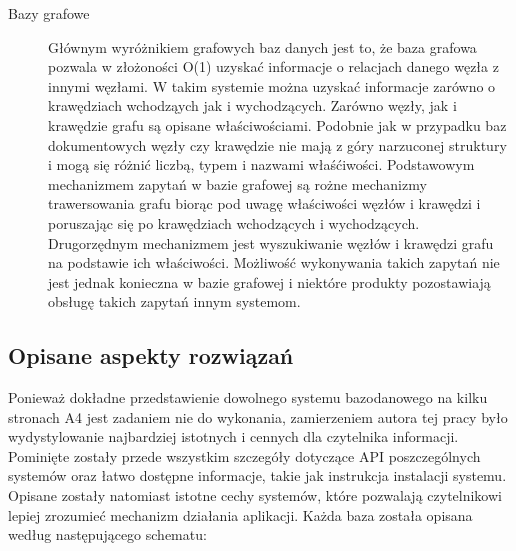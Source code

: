 \begin{description}
 \item[Bazy grafowe]
 Głównym wyróżnikiem grafowych baz danych jest to, że baza grafowa pozwala w złożoności O(1) uzyskać informacje o relacjach danego węzła z innymi węzłami.
 W takim systemie można uzyskać informacje zarówno o krawędziach wchodząych jak i wychodzących.
 Zarówno węzły, jak i krawędzie grafu są opisane właściwościami.
 Podobnie jak w przypadku baz dokumentowych węzły czy krawędzie nie mają z góry narzuconej struktury i mogą się różnić liczbą, typem i nazwami właśćiwości.
 Podstawowym mechanizmem zapytań w bazie grafowej są rożne mechanizmy trawersowania grafu biorąc pod uwagę właściwości węzłów i krawędzi i poruszając się po krawędziach wchodzących i wychodzących.
 Drugorzędnym mechanizmem jest wyszukiwanie węzłów i krawędzi grafu na podstawie ich właściwości.
 Możliwość wykonywania takich zapytań nie jest jednak konieczna w bazie grafowej i niektóre produkty pozostawiają obsługę takich zapytań innym systemom. 
\end{description}

\subsection*{Opisane aspekty rozwiązań}

Ponieważ dokładne przedstawienie dowolnego systemu bazodanowego na kilku stronach A4 jest zadaniem nie do wykonania, zamierzeniem autora tej pracy było wydystylowanie najbardziej istotnych i cennych dla czytelnika informacji.
Pominięte zostały przede wszystkim szczegóły dotyczące API poszczególnych systemów oraz łatwo dostępne informacje, takie jak instrukcja instalacji systemu.
Opisane zostały natomiast istotne cechy systemów, które pozwalają czytelnikowi lepiej zrozumieć mechanizm działania aplikacji.
Każda baza została opisana według następującego schematu:

